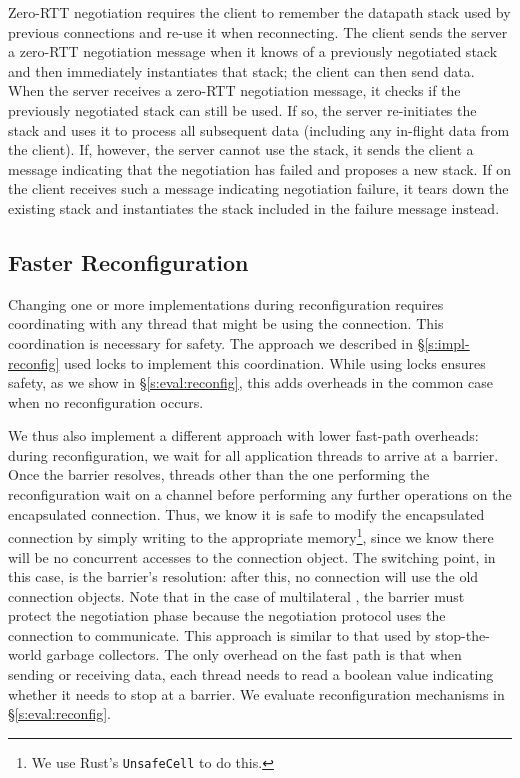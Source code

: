 Zero-RTT negotiation requires the client to remember the datapath stack used by previous connections and re-use it when reconnecting. 
The client sends the server a zero-RTT negotiation message when it knows of a previously negotiated stack and then immediately instantiates that stack; the client can then send data. 
When the server receives a zero-RTT negotiation message, it checks if the previously negotiated stack can still be used. If so, the server re-initiates the stack and uses it to process all subsequent data (including any in-flight data from the client). If, however, the server cannot use the stack, it sends the client a message indicating that the negotiation has failed and proposes a new stack. If \name on the client receives such a message indicating negotiation failure, it tears down the existing stack and instantiates the stack included in the failure message instead.

\subsection{Faster Reconfiguration}\label{s:impl:fast-reconfig}

Changing one or more \tunnel implementations during reconfiguration requires coordinating with any thread that might be using the connection. This coordination is necessary for safety.
The approach we described in \S\ref{s:impl-reconfig} used locks to implement this coordination. While using locks ensures safety, as we show in \S\ref{s:eval:reconfig}, this adds overheads in the common case when no reconfiguration occurs.

We thus also implement a different approach with lower fast-path overheads: during reconfiguration, we wait for all application threads to arrive at a barrier. Once the barrier resolves, threads other than the one performing the reconfiguration wait on a channel before performing any further operations on the encapsulated connection. Thus, we know it is safe to modify the encapsulated connection by simply writing to the appropriate memory\footnote{We use Rust's \texttt{UnsafeCell} to do this.}, since we know there will be no concurrent accesses to the connection object. 
The switching point, in this case, is the barrier's resolution: after this, no connection will use the old connection objects.
Note that in the case of multilateral \tunnels, the barrier must protect the negotiation phase because the negotiation protocol uses the connection to communicate.
This approach is similar to that used by stop-the-world garbage collectors. The only overhead on the fast path is that when sending or receiving data, each thread needs to read a boolean value indicating whether it needs to stop at a barrier.
We evaluate reconfiguration mechanisms in \S\ref{s:eval:reconfig}.

